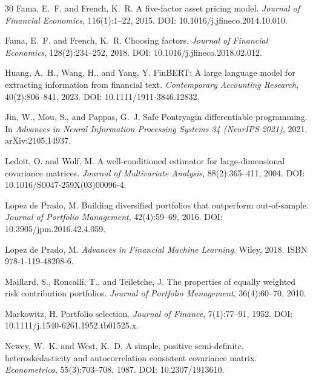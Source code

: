 \begin{thebibliography}{30}
Fama, E.~F. and French, K.~R.
\newblock A five-factor asset pricing model.
\newblock \emph{Journal of Financial Economics}, 116(1):1--22, 2015.
\newblock DOI: 10.1016/j.jfineco.2014.10.010.

Fama, E.~F. and French, K.~R.
\newblock Choosing factors.
\newblock \emph{Journal of Financial Economics}, 128(2):234--252, 2018.
\newblock DOI: 10.1016/j.jfineco.2018.02.012.

Huang, A.~H., Wang, H., and Yang, Y.
\newblock FinBERT: A large language model for extracting information from financial text.
\newblock \emph{Contemporary Accounting Research}, 40(2):806--841, 2023.
\newblock DOI: 10.1111/1911-3846.12832.

Jin, W., Mou, S., and Pappas, G.~J.
\newblock Safe Pontryagin differentiable programming.
\newblock In \emph{Advances in Neural Information Processing Systems 34 (NeurIPS 2021)}, 2021. arXiv:2105.14937.

Ledoit, O. and Wolf, M.
\newblock A well-conditioned estimator for large-dimensional covariance matrices.
\newblock \emph{Journal of Multivariate Analysis}, 88(2):365--411, 2004.
\newblock DOI: 10.1016/S0047-259X(03)00096-4.

Lopez de Prado, M.
\newblock Building diversified portfolios that outperform out-of-sample.
\newblock \emph{Journal of Portfolio Management}, 42(4):59--69, 2016.
\newblock DOI: 10.3905/jpm.2016.42.4.059.

Lopez de Prado, M.
\newblock \emph{Advances in Financial Machine Learning}.
\newblock Wiley, 2018.
\newblock ISBN 978-1-119-48208-6.

Maillard, S., Roncalli, T., and Te\"{\i}letche, J.
\newblock The properties of equally weighted risk contribution portfolios.
\newblock \emph{Journal of Portfolio Management}, 36(4):60--70, 2010.

Markowitz, H.
\newblock Portfolio selection.
\newblock \emph{Journal of Finance}, 7(1):77--91, 1952.
\newblock DOI: 10.1111/j.1540-6261.1952.tb01525.x.

Newey, W.~K. and West, K.~D.
\newblock A simple, positive semi-definite, heteroskedasticity and autocorrelation consistent covariance matrix.
\newblock \emph{Econometrica}, 55(3):703--708, 1987.
\newblock DOI: 10.2307/1913610.


\end{thebibliography}
